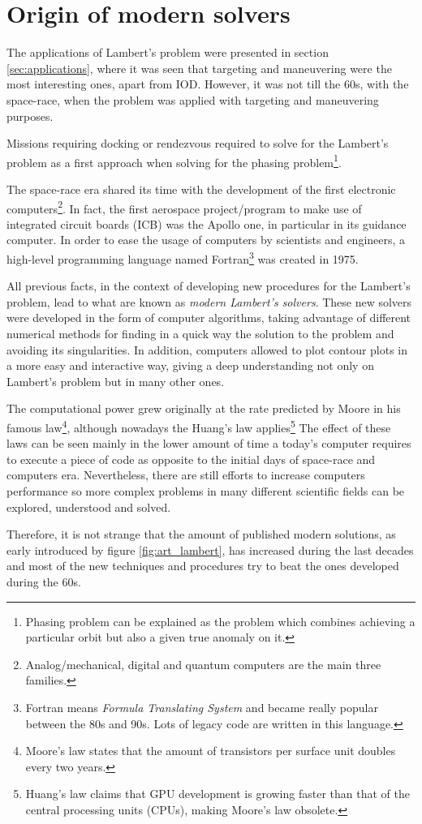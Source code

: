 \section{Origin of modern solvers}

The applications of Lambert's problem were presented in section
\ref{sec:applications}, where it was seen that targeting and maneuvering were
the most interesting ones, apart from IOD. However, it was not till the 60s,
with the space-race, when the problem was applied with targeting and maneuvering
purposes.

Missions requiring docking or rendezvous required to solve for the Lambert's
problem as a first approach when solving for the phasing
problem\footnote{Phasing problem can be explained as the problem which combines
achieving a particular orbit but also a given true anomaly on it.}.

The space-race era shared its time with the development of the first electronic
computers\footnote{Analog/mechanical, digital and quantum computers are the main
three families.}. In fact, the first aerospace project/program to make use of
integrated circuit boards (ICB) was the Apollo one, in particular in its
guidance computer. In order to ease the usage of computers by scientists and
engineers, a high-level programming language named Fortran\footnote{Fortran
means \textit{Formula Translating System} and became really popular between the
80s and 90s. Lots of legacy code are written in this language.} was created in
1975.

All previous facts, in the context of developing new procedures for the
Lambert's problem, lead to what are known as \textit{modern Lambert's solvers}.
These new solvers were developed in the form of computer algorithms, taking
advantage of different numerical methods for finding in a quick way the solution
to the problem and avoiding its singularities. In addition, computers allowed to
plot contour plots in a more easy and interactive way, giving a deep
understanding not only on Lambert's problem but in many other ones.

The computational power grew originally at the rate predicted by Moore in his
famous law\footnote{Moore's law states that the amount of transistors per
surface unit doubles every two years.}, although nowadays the Huang's law
applies\footnote{Huang's law claims that GPU development is growing faster than
that of the central processing units (CPUs), making Moore's law obsolete.} The
effect of these laws can be seen mainly in the lower amount of time a today's
computer requires to execute a piece of code as opposite to the initial days of
space-race and computers era. Nevertheless, there are still efforts to increase
computers performance so more complex problems in many different scientific
fields can be explored, understood and solved.

Therefore, it is not strange that the amount of published modern solutions, as
early introduced by figure \ref{fig:art_lambert}, has increased during the last
decades and most of the new techniques and procedures try to beat the ones
developed during the 60s.

